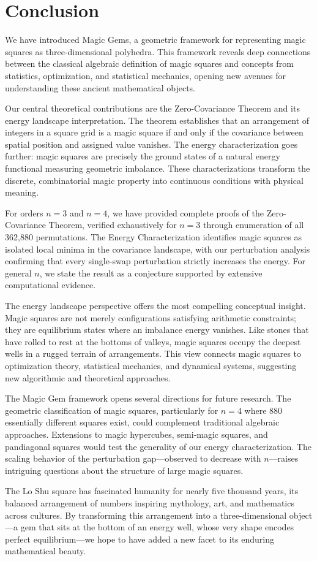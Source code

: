\section{Conclusion}
\label{sec:conclusion}

We have introduced Magic Gems, a geometric framework for representing magic squares 
as three-dimensional polyhedra.
This framework reveals deep connections between the classical algebraic definition of magic squares
and concepts from statistics, optimization, and statistical mechanics,
opening new avenues for understanding these ancient mathematical objects.

Our central theoretical contributions are the Zero-Covariance Theorem and its energy landscape interpretation.
The theorem establishes that an arrangement of integers in a square grid is a magic square 
if and only if the covariance between spatial position and assigned value vanishes.
The energy characterization goes further: 
magic squares are precisely the ground states of a natural energy functional 
measuring geometric imbalance.
These characterizations transform the discrete, combinatorial magic property
into continuous conditions with physical meaning.

For orders $n = 3$ and $n = 4$, we have provided complete proofs of the Zero-Covariance Theorem,
verified exhaustively for $n = 3$ through enumeration of all 362,880 permutations.
The Energy Characterization identifies magic squares as isolated local minima 
in the covariance landscape, with our perturbation analysis confirming that every single-swap perturbation 
strictly increases the energy.
For general $n$, we state the result as a conjecture supported by extensive computational evidence.

The energy landscape perspective offers the most compelling conceptual insight.
Magic squares are not merely configurations satisfying arithmetic constraints;
they are equilibrium states where an imbalance energy vanishes.
Like stones that have rolled to rest at the bottoms of valleys,
magic squares occupy the deepest wells in a rugged terrain of arrangements.
This view connects magic squares to optimization theory, statistical mechanics, and dynamical systems,
suggesting new algorithmic and theoretical approaches.

The Magic Gem framework opens several directions for future research.
The geometric classification of magic squares, particularly for $n = 4$ where 880 essentially different squares exist,
could complement traditional algebraic approaches.
Extensions to magic hypercubes, semi-magic squares, and pandiagonal squares 
would test the generality of our energy characterization.
The scaling behavior of the perturbation gap---observed to decrease with $n$---raises 
intriguing questions about the structure of large magic squares.

The Lo Shu square has fascinated humanity for nearly five thousand years,
its balanced arrangement of numbers inspiring mythology, art, and mathematics across cultures.
By transforming this arrangement into a three-dimensional object---a gem 
that sits at the bottom of an energy well, whose very shape encodes perfect equilibrium---we 
hope to have added a new facet to its enduring mathematical beauty.

